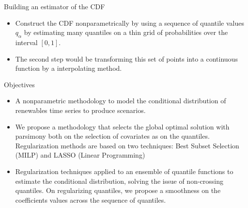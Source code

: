 \documentclass[11pt]{beamer}
\begin{document}
	

\begin{frame}{Building an estimator of the CDF}

	\begin{itemize}
		\item Construct the CDF nonparametrically by using a sequence of quantile values $q_\alpha$ by estimating many quantiles on a thin grid of probabilities over the interval $[0,1]$. 
		
		\item The second step would be transforming this set of points into a continuous function by a interpolating method. 

	\end{itemize}
    
\end{frame}




\begin{frame}{Objectives}

\begin{itemize}
\item A nonparametric methodology to model the conditional distribution of renewables time series to produce scenarios.

\item We propose a methodology that selects the global optimal solution with parsimony both on the selection of covariates as on the quantiles. Regularization methods are based on two techniques: Best Subset Selection (MILP) and LASSO (Linear Programming) 

\item Regularization techniques applied to an ensemble of quantile functions to estimate the conditional distribution, solving the issue of non-crossing quantiles. On regularizing quantiles, we propose a smoothness on the coefficients values across the sequence of quantiles. 

\end{itemize}

\end{frame}
\end{document}
